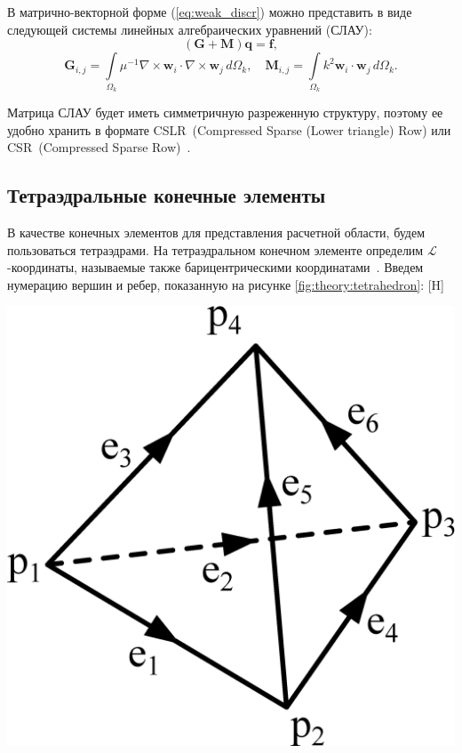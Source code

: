 \documentclass[a4paper,14pt]{article}
\makeatletter
\renewenvironment{figure}[1][\fps@figure]{
  \edef\@tempa{\noexpand\@float{figure}[#1]}
  \@tempa
  \addtocounter{foofigure}{1}
}{
  \end@float
}
\makeatother
\begin{document}
В матрично-векторной форме (\ref{eq:weak_discr}) можно представить в виде следующей системы линейных алгебраических уравнений (СЛАУ):
\begin{equation}
	( \mathbf{G} + \mathbf{M} )\mathbf{q} = \mathbf{f} , \label{eq:form_29}
\end{equation}
\begin{equation*}
	\mathbf{G}_{ i,j } = \int\limits_{\Omega_k} \mu^{-1} \nabla \times \mathbf{w}_i \cdot \nabla \times \mathbf{w}_j \,d\Omega_k , \text{~~~}
	\mathbf{M}_{ i,j } = \int\limits_{\Omega_k} k^2 \mathbf{w}_i \cdot \mathbf{w}_j \,d\Omega_k . \label{eq:local_matrixes}
\end{equation*}

Матрица СЛАУ будет иметь симметричную разреженную структуру, поэтому ее удобно хранить в формате CSLR~(Compressed Sparse (Lower triangle) Row) или CSR~(Compressed Sparse Row)~\citep{balandin_slae}.


\subsection{Тетраэдральные конечные элементы}

В качестве конечных элементов для представления расчетной области, будем пользоваться тетраэдрами. На тетраэдральном конечном элементе определим $\mathcal{L}$-ко\-ор\-ди\-на\-ты, называемые также барицентрическими координатами~\citep{soloveychick}. Введем нумерацию вершин и ребер, показанную на рисунке \ref{fig:theory:tetrahedron}:
\begin{figure}[H]
	\centering
	\includegraphics[scale=0.25]{theory/tetrahedron.eps}
	\caption{тетраэдральный конечный элемент}
	\label{fig:theory:tetrahedron}
\end{figure}
\end{document}
